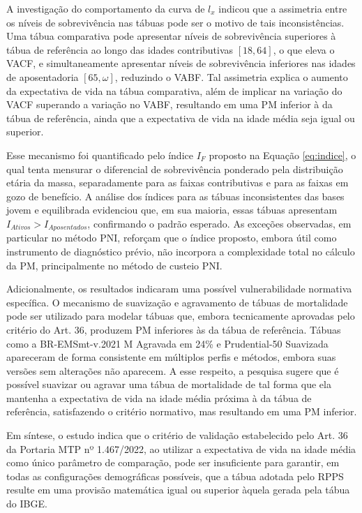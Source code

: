 A investigação do comportamento da curva de $l_x$ indicou que a assimetria entre os níveis de sobrevivência nas tábuas pode ser o motivo de tais inconsistências. Uma tábua comparativa pode apresentar níveis de sobrevivência superiores à tábua de referência ao longo das idades contributivas $[18, 64]$, o que eleva o VACF, e simultaneamente apresentar níveis de sobrevivência inferiores nas idades de aposentadoria $[65, \omega]$, reduzindo o VABF. Tal assimetria explica o aumento da expectativa de vida na tábua comparativa, além de implicar na variação do VACF superando a variação no VABF, resultando em uma PM inferior à da tábua de referência, ainda que a expectativa de vida na idade média seja igual ou superior.

Esse mecanismo foi quantificado pelo índice $I_F$ proposto na Equação \ref{eq:indice}, o qual tenta mensurar o diferencial de sobrevivência ponderado pela distribuição etária da massa, separadamente para as faixas contributivas e para as faixas em gozo de benefício. A análise dos índices para as tábuas inconsistentes das bases jovem e equilibrada evidenciou que, em sua maioria, essas tábuas apresentam $I_{Ativos} > I_{Aposentados}$, confirmando o padrão esperado. As exceções observadas, em particular no método PNI, reforçam que o índice proposto, embora útil como instrumento de diagnóstico prévio, não incorpora a complexidade total no cálculo da PM, principalmente no método de custeio PNI.

Adicionalmente, os resultados indicaram uma possível vulnerabilidade normativa específica. O mecanismo de suavização e agravamento de tábuas de mortalidade pode ser utilizado para modelar tábuas que, embora tecnicamente aprovadas pelo critério do Art. 36, produzem PM inferiores às da tábua de referência. Tábuas como a BR-EMSmt-v.2021 M Agravada em 24\% e Prudential-50 Suavizada apareceram de forma consistente em múltiplos perfis e métodos, embora suas versões sem alterações não aparecem. A esse respeito, a pesquisa sugere que é possível suavizar ou agravar uma tábua de mortalidade de tal forma que ela mantenha a expectativa de vida na idade média próxima à da tábua de referência, satisfazendo o critério normativo, mas resultando em uma PM inferior.

Em síntese, o estudo indica que o critério de validação estabelecido pelo Art. 36 da Portaria MTP nº 1.467/2022, ao utilizar a expectativa de vida na idade média como único parâmetro de comparação, pode ser insuficiente para garantir, em todas as configurações demográficas possíveis, que a tábua adotada pelo RPPS resulte em uma provisão matemática igual ou superior àquela gerada pela tábua do IBGE.

